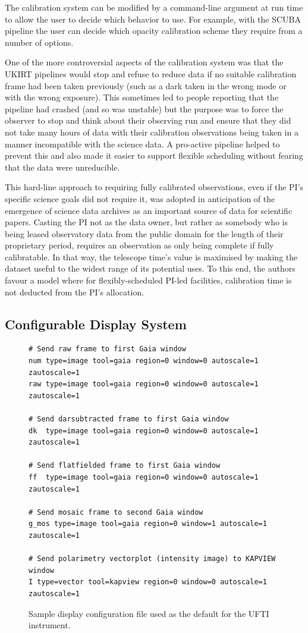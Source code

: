 \documentclass[final,authoryear,5p,times,twocolumn]{elsarticle}
\begin{document}
The calibration system can be modified by a command-line argument at
run time to allow the user to decide which behavior to use. For
example, with the SCUBA pipeline \citep{1999ASPC..172..171J} the user
can decide which opacity calibration scheme they require from a number
of options.

One of the more controversial aspects of the calibration system was
that the UKIRT pipelines would stop and refuse to reduce data if no
suitable calibration frame had been taken previously (such as a dark
taken in the wrong mode or with the wrong exposure). This sometimes
led to people reporting that the pipeline had crashed (and so was
unstable) but the purpose was to force the observer to stop and think
about their observing run and ensure that they did not take many hours
of data with their calibration observations being taken in a manner
incompatible with the science data. A pro-active pipeline helped to
prevent this and also made it easier to support flexible scheduling
\citep{2002ASPC..281..488E,2004SPIE.5493...24A} without fearing that
the data were unreducible.

This hard-line approach to requiring fully calibrated observations,
even if the PI's specific science goals did not require it, was
adopted in anticipation of the emergence of science data archives as
an important source of data for scientific papers. Casting the PI not
as the data owner, but rather as somebody who is being leased
observatory data from the public domain for the length of their
proprietary period, requires an observation as only being complete if
fully calibratable. In that way, the telescope time's value is
maximised by making the dataset useful to the widest range of its
potential uses. To this end, the authors favour a model where for
flexibly-scheduled PI-led facilities, calibration time is not deducted
from the PI's allocation.

\subsection{Configurable Display System}

\begin{figure}
{\small
\begin{verbatim}
# Send raw frame to first Gaia window
num type=image tool=gaia region=0 window=0 autoscale=1 zautoscale=1
raw type=image tool=gaia region=0 window=0 autoscale=1 zautoscale=1

# Send darsubtracted frame to first Gaia window
dk  type=image tool=gaia region=0 window=0 autoscale=1 zautoscale=1

# Send flatfielded frame to first Gaia window
ff  type=image tool=gaia region=0 window=0 autoscale=1 zautoscale=1

# Send mosaic frame to second Gaia window
g_mos type=image tool=gaia region=0 window=1 autoscale=1 zautoscale=1

# Send polarimetry vectorplot (intensity image) to KAPVIEW window
I type=vector tool=kapview region=0 window=0 autoscale=1 zautoscale=1
\end{verbatim}
}
\caption{Sample display configuration file used as the default for the
  UFTI instrument.}
\label{fig:disp}
\end{figure}
\end{document}
